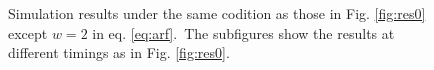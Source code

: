 \documentclass[a4paper,12pt, oneside]{book}
\begin{document}
\begin{figure}[tbp]
 \caption{Simulation results under the same codition as those in Fig. \ref{fig:res0} except $w=2$ in eq. \ref{eq:arf}.~The subfigures show the results at different timings as in Fig. \ref{fig:res0}.}
 \label{fig:res1}
\end{figure}
\end{document}
